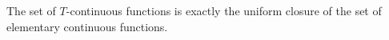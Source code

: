 The set of $T$-continuous functions is exactly the uniform closure of the set of elementary continuous functions.
